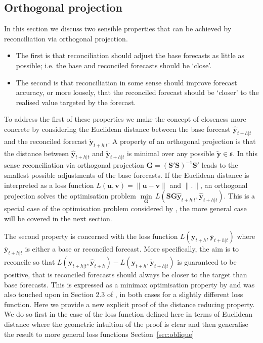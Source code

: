 \documentclass[12pt]{article}
\theoremstyle{definition}
\begin{document}
\subsection{Orthogonal projection}\label{sec:orthogonal}

In this section we discuss two sensible properties that can be achieved by reconciliation via orthogonal projection.
\begin{itemize}
\item The first is that reconciliation should adjust the base forecasts as little as possible; i.e. the base and reconciled forecasts should be `close'. 
\item The second is that reconciliation in some sense should improve forecast accuracy, or more loosely, that the reconciled forecast should be `closer' to the realised value targeted by the forecast.
\end{itemize}

To address the first of these properties we make the concept of closeness more concrete by considering the Euclidean distance between the base forecast $\hat{\bm{y}}_{t+h|t}$ and the reconciled forecast $\tilde{\bm{y}}_{t+h|t}$. A property of an orthogonal projection is that the distance between $\hat{\bm{y}}_{t+h|t}$ and $\tilde{\bm{y}}_{t+h|t}$ is minimal over any possible $\tilde{\bm{y}}\in\mathfrak{s}$. In this sense reconciliation via orthogonal projection {\color{blue} $\bm{G}=(\bm{S}'\bm{S})^{-1}\bm{S}'$} leads to the smallest possible adjustments of the base forecasts.  {\color{blue} If the Euclidean distance is interpreted as a loss function $L(\bm{u},\bm{v})=\|\bm{u}-\bm{v}\|$ and $\|.\|$, an orthogonal projection solves the optimisation problem $\underset{\bm{G}}{\min}\,L(\bm{S}\bm{G}\hat{\bm{y}}_{t+h|t},\hat{\bm{y}}_{t+h|t})$. This is a special case of the optimisation problem considered by \cite{NysEtAl2019}, the more general case will be covered in the next section.}

The {\color{blue} second property is concerned with the loss function $L({\bm{y}}_{t+h},\bar{\bm{y}}_{t+h|t})$ where $\bar{\bm{y}}_{t+h|t}$ is either a base or reconciled forecast.  More specifically, the aim is to reconcile so that $L({\bm{y}}_{t+h|t},\hat{\bm{y}}_{t+h})-L({\bm{y}}_{t+h},\tilde{\bm{y}}_{t+h|t})$ is guaranteed to be positive, that is} reconciled forecasts should always be closer to the target than base forecasts. {\color{blue} This is expressed as a minimax optimisation property by \cite{VanErven2015a} and was also} touched upon in Section 2.3 of \citet{WicEtAl2019}{\color{blue}, in both cases for a slightly different loss function}. Here we provide a new explicit proof of {\color{blue} the distance reducing property}. We do so first in the case {\color{blue} of the loss function defined here in terms of Euclidean distance} where the geometric intuition of the proof is clear and then generalise the result to {\color{blue} more general loss functions} Section~\ref{sec:oblique}
\end{document}
